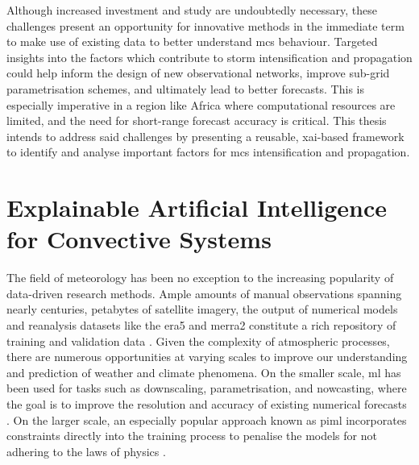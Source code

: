 Although increased investment and study are undoubtedly necessary, these challenges present an opportunity for innovative methods in the immediate term to make use of existing data to better understand \acrshort{mcs} behaviour. Targeted insights into the factors which contribute to storm intensification and propagation could help inform the design of new observational networks, improve sub-grid parametrisation schemes, and ultimately lead to better forecasts. This is especially imperative in a region like Africa where computational resources are limited, and the need for short-range forecast accuracy is critical. This thesis intends to address said challenges by presenting a reusable, \acrfull{xai}-based framework to identify and analyse important factors for \acrshort{mcs} intensification and propagation.

\section{Explainable Artificial Intelligence for Convective Systems}

The field of meteorology has been no exception to the increasing popularity of data-driven research methods. Ample amounts of manual observations spanning nearly centuries, petabytes of satellite imagery, the output of numerical models and reanalysis datasets like the \acrfull{era5} and \acrfull{merra2} constitute a rich repository of training and validation data \citep{Bracco2024,Waqas2024,Zhang2025}. Given the complexity of atmospheric processes, there are numerous opportunities at varying scales to improve our understanding and prediction of weather and climate phenomena. On the smaller scale, \acrfull{ml} has been used for tasks such as downscaling, parametrisation, and nowcasting, where the goal is to improve the resolution and accuracy of existing numerical forecasts \citep{Blunn2024,Zhang2023}. On the larger scale, an especially popular approach known as \acrfull{piml} incorporates constraints directly into the training process to penalise the models for not adhering to the laws of physics \citep{Pathak2022,Luo2025,Zhang2023}.

